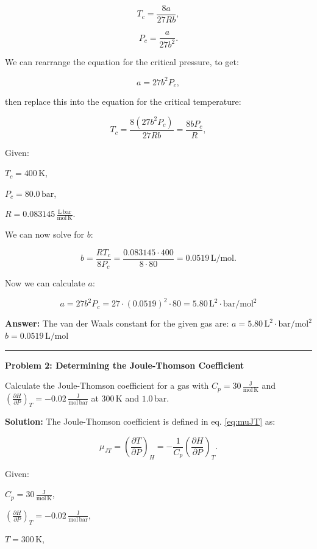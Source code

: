 \documentclass[
  9pt,
]{extbook}
\theoremstyle{definition}
\theoremstyle{definition}
\theoremstyle{definition}
\theoremstyle{definition}
\theoremstyle{remark}
\begin{document}
\[T_c = \frac{8a}{27Rb},\]

\[P_c = \frac{a}{27b^2}.\]

We can rearrange the equation for the critical pressure, to get:

\[a = 27b^2P_c,\]

then replace this into the equation for the critical temperature:

\[T_c = \frac{8(27b^2P_c)}{27Rb} = \frac{8bP_c}{R},\]

Given:

\(T_c = 400\,\text{K}\),

\(P_c = 80.0\,\text{bar}\),

\(R = 0.083145\,\frac{\text{L}\,\text{bar}}{\text{mol}\,\text{K}}\).

We can now solve for \(b\):

\[b = \frac{RT_c}{8P_c} = \frac{0.083145 \cdot 400}{8 \cdot 80} = 0.0519\,\text{L}/\text{mol}.\]

Now we can calculate \(a\):

\[a = 27b^2P_c = 27 \cdot (0.0519)^2 \cdot 80 = 5.80\,\text{L}^2\cdot\text{bar}/\text{mol}^2\]

\textbf{Answer:} The van der Waals constant for the given gas are:
\(a = 5.80\,\text{L}^2\cdot\text{bar}/\text{mol}^2\)
\(b = 0.0519\,\text{L}/\text{mol}\)

\begin{center}\rule{0.5\linewidth}{0.5pt}\end{center}

\textbf{Problem 2: Determining the Joule-Thomson Coefficient}

Calculate the Joule-Thomson coefficient for a gas with \(C_p = 30\,\frac{\text{J}}{\text{mol}\,\text{K}}\) and \(\left(\frac{\partial H}{\partial P}\right)_T = -0.02\,\frac{\text{J}}{\text{mol}\,\text{bar}}\) at \(300\,\text{K}\) and \(1.0\,\text{bar}\).

\textbf{Solution:} The Joule-Thomson coefficient is defined in eq. \eqref{eq:muJT} as:

\[\mu_{JT} = \left(\frac{\partial T}{\partial P}\right)_H = -\frac{1}{C_p}\left(\frac{\partial H}{\partial P}\right)_T.\]

Given:

\(C_p = 30\,\frac{\text{J}}{\text{mol}\,\text{K}}\),

\(\left(\frac{\partial H}{\partial P}\right)_T = -0.02\,\frac{\text{J}}{\text{mol}\,\text{bar}}\),

\(T = 300\,\text{K}\),
\end{document}
